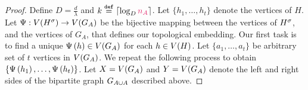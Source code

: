 \documentclass[11pt]{article}
\begin{document}
\begin{proof}
Define $D = \frac{d}{\lambda}$ and $k \Def \lceil\log_D\na\rceil$.
Let $\{ h_1, \dots, h_t\}$ denote the vertices of $H$.
Let $\Psi: V({H}^{\sigma}) \rightarrow V(G_A)$ be the bijective mapping between the vertices of ${H}^{\sigma}$, and the vertices of $G_A$, that defines our topological embedding.
Our first task is to find a unique $\Psi\left(h\right) \in V(G_A)$ for each $h \in V(H)$.
Let $\{a_1, \dots, a_{t}\}$ be arbitrary set of $t$ vertices in $V(G_A)$.
We repeat the following process to obtain $\{ \Psi\left(h_1\right), \dots, \Psi\left(h_t\right)\}$.
Let $X=V(G_A)$ and $Y=V(G_A)$ denote the left and right sides of the bipartite graph $G_{A \cup A}$ described above.


\end{proof}
\end{document}
